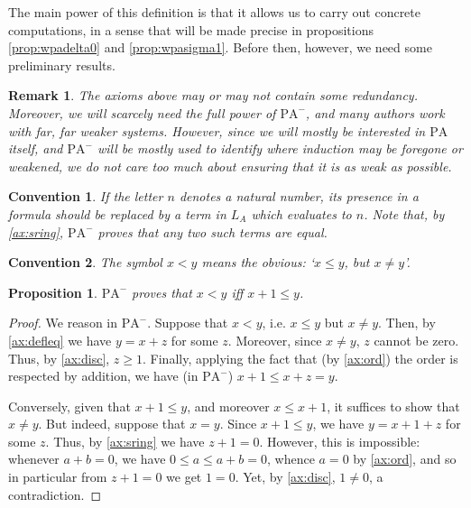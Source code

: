 \documentclass{article}
\newtheorem{prop}[theorem]{Proposition}
\newtheorem{remark}[theorem]{Remark}
\theoremstyle{nonumberplain}
\newtheorem{convention}{Convention}
\newtheorem{proof}{Proof}
\newcommand{\LA}{L_A}
\newcommand{\PA}{\mathrm{PA}}
\newcommand{\WPA}{\PA^-}
\begin{document}
The main power of this definition is that it allows us to carry out concrete computations, in a sense that will be made precise in propositions \ref{prop:wpadelta0} and \ref{prop:wpasigma1}. Before then, however, we need some preliminary results.

\begin{remark}
The axioms above may or may not contain some redundancy. Moreover, we will scarcely need the full power of $\WPA$, and many authors work with far, far weaker systems. However, since we will mostly be interested in $\PA$ itself, and $\WPA$ will be mostly used to identify where induction may be foregone or weakened, we do not care too much about ensuring that it is as weak as possible.
\end{remark}

\begin{convention}
If the letter $n$ denotes a natural number, its presence in a formula should be replaced by a term in $\LA$ which evaluates to $n$. Note that, by \eqref{ax:sring}, $\WPA$ proves that any two such terms are equal.
\end{convention}

\begin{convention}
The symbol $x < y$ means the obvious: `$x \leq y$, but $x \neq y$'.
\end{convention}

\begin{prop}\label{prop:leq}
$\WPA$ proves that $x < y$ iff $x+1 \leq y$.
\end{prop}

\begin{proof}
We reason in $\WPA$. Suppose that $x < y$, i.e. $x \leq y$ but $x \neq y$. Then, by \eqref{ax:defleq} we have $y = x+z$ for some $z$. Moreover, since $x \neq y$, $z$ cannot be zero. Thus, by \eqref{ax:disc}, $z \geq 1$. Finally, applying the fact that (by \eqref{ax:ord}) the order is respected by addition, we have (in $\WPA$) $x+1 \leq x+z = y$.

Conversely, given that $x+1 \leq y$, and moreover $x \leq x+1$, it suffices to show that $x \neq y$. But indeed, suppose that $x = y$. Since $x+1 \leq y$, we have $y = x+1+z$ for some $z$. Thus, by \eqref{ax:sring} we have $z+1 = 0$. However, this is impossible: whenever $a+b = 0$, we have $0 \leq a \leq a+b = 0$, whence $a = 0$ by \eqref{ax:ord}, and so in particular from $z+1 = 0$ we get $1=0$. Yet, by \eqref{ax:disc}, $1 \neq 0$, a contradiction.
\end{proof}
\end{document}
